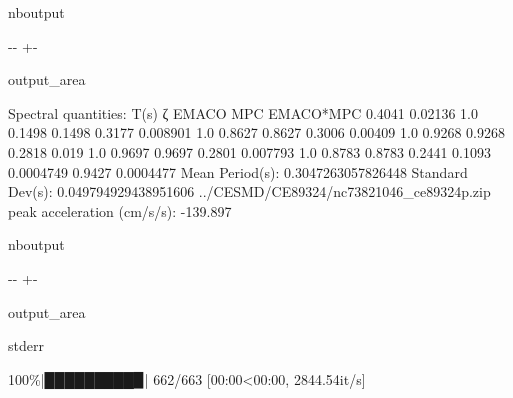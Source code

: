 \documentclass[letterpaper,10pt,english]{sphinxmanual}
\begin{document}
\begin{sphinxuseclass}{nboutput}
{

\kern-\sphinxverbatimsmallskipamount\kern-\baselineskip
\kern+\FrameHeightAdjust\kern-\fboxrule
\vspace{\nbsphinxcodecellspacing}

\begin{sphinxuseclass}{output_area}
\begin{sphinxuseclass}{}


\begin{sphinxVerbatim}[commandchars=\\\{\}]
Spectral quantities:
       T(s)        ζ        EMACO        MPC     EMACO*MPC
      0.4041     0.02136    1.0        0.1498     0.1498
      0.3177     0.008901   1.0        0.8627     0.8627
      0.3006     0.00409    1.0        0.9268     0.9268
      0.2818     0.019      1.0        0.9697     0.9697
      0.2801     0.007793   1.0        0.8783     0.8783
      0.2441     0.1093     0.0004749  0.9427     0.0004477
Mean Period(s): 0.3047263057826448
Standard Dev(s): 0.049794929438951606
../CESMD/CE89324/nc73821046\_ce89324p.zip
peak acceleration (cm/s/s): -139.897
\end{sphinxVerbatim}



\end{sphinxuseclass}
\end{sphinxuseclass}
}

\end{sphinxuseclass}
\begin{sphinxuseclass}{nboutput}
{

\kern-\sphinxverbatimsmallskipamount\kern-\baselineskip
\kern+\FrameHeightAdjust\kern-\fboxrule
\vspace{\nbsphinxcodecellspacing}

\begin{sphinxuseclass}{output_area}
\begin{sphinxuseclass}{stderr}


\begin{sphinxVerbatim}[commandchars=\\\{\}]
100\%|█████████▉| 662/663 [00:00<00:00, 2844.54it/s]
\end{sphinxVerbatim}



\end{sphinxuseclass}
\end{sphinxuseclass}
}

\end{sphinxuseclass}
\end{document}
